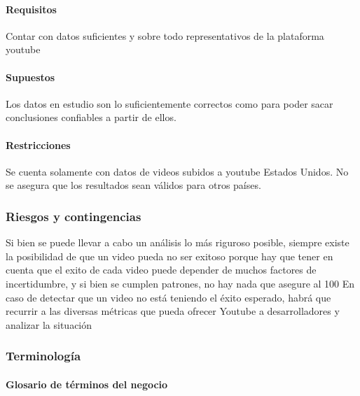         \paragraph{Requisitos}
        Contar con datos suficientes y sobre todo representativos de la
        plataforma youtube
        \paragraph{Supuestos}
        Los datos en estudio son lo suficientemente correctos como para poder
        sacar conclusiones confiables a partir de ellos.
        \paragraph{Restricciones}
        Se cuenta solamente con datos de videos subidos a youtube
        Estados Unidos. No se asegura que los resultados sean válidos para
        otros países.

    \subsubsection{Riesgos y contingencias}

        Si bien se puede llevar a cabo un análisis lo más riguroso posible, siempre existe la
        posibilidad de que un video pueda no ser exitoso porque hay que tener en
        cuenta que el exito de cada video puede depender de muchos factores de
        incertidumbre, y si bien se cumplen patrones, no hay nada que asegure al
        100%
        En caso de detectar que un video no está teniendo el éxito esperado,
        habrá que recurrir a las diversas métricas que pueda ofrecer Youtube a
        desarrolladores y analizar la situación

    \subsubsection{Terminología}

        \paragraph{Glosario de términos del negocio\\\\}

